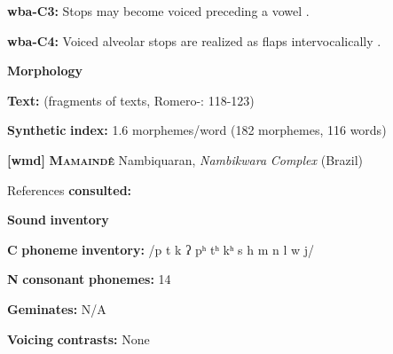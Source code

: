 \documentclass[output=paper]{langsci/langscibook}
\begin{document}
\begin{styleBody}
\textbf{wba-C3:} Stops may become voiced preceding a vowel \citep[107]{Arinterol1997}.
\end{styleBody}

\begin{styleBody}
\textbf{wba-C4:} Voiced alveolar stops are realized as flaps intervocalically \citep[107]{Arinterol1997}.
\end{styleBody}

\begin{styleBody}
\textbf{Morphology}
\end{styleBody}

\begin{styleBody}
\textbf{Text:} (fragments of texts, Romero-\citealt{Figeroa1997}: 118-123)
\end{styleBody}

\begin{styleBody}
\textbf{Synthetic} \textbf{index:} 1.6 morphemes/word (182 morphemes, 116 words)
\end{styleBody}

\begin{styleBody}
\textbf{[wmd]} \textbf{\textsc{Mamaindê}}  Nambiquaran, \textit{Nambikwara} \textit{Complex} (Brazil)
\end{styleBody}

\begin{styleBody}
References \textbf{consulted:} \citet{Eberhard2009}
\end{styleBody}

\begin{styleBody}
\textbf{Sound} \textbf{inventory}
\end{styleBody}

\begin{styleBody}
\textbf{C} \textbf{phoneme} \textbf{inventory:} /p t k ʔ pʰ tʰ kʰ s h m n l w j/
\end{styleBody}

\begin{styleBody}
\textbf{N} \textbf{consonant} \textbf{phonemes:} 14
\end{styleBody}

\begin{styleBody}
\textbf{Geminates:} N/A
\end{styleBody}

\begin{styleBody}
\textbf{Voicing} \textbf{contrasts:} None
\end{styleBody}
\end{document}
